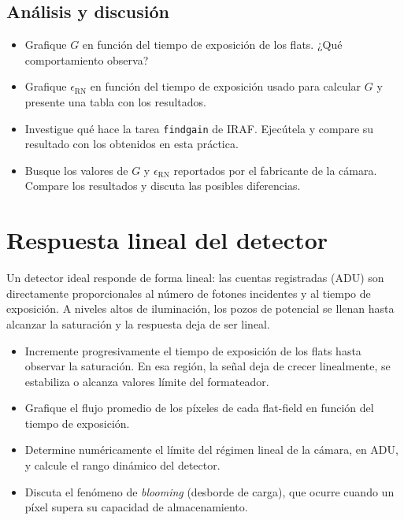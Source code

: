 \documentclass[12pt,a4paper]{article}
\begin{document}
\subsection{Análisis y discusión}

\begin{itemize}
    \item Grafique $G$ en función del tiempo de exposición de los flats.
    ¿Qué comportamiento observa?
    \item Grafique $\epsilon_{\text{RN}}$ en función del tiempo de exposición
    usado para calcular $G$ y presente una tabla con los resultados.
    \item Investigue qué hace la tarea \texttt{findgain} de IRAF. Ejecútela y
    compare su resultado con los obtenidos en esta práctica.
    \item Busque los valores de $G$ y $\epsilon_{\text{RN}}$ reportados por el
    fabricante de la cámara. Compare los resultados y discuta las posibles
    diferencias.
\end{itemize}

\section{Respuesta lineal del detector}

Un detector ideal responde de forma lineal: las cuentas registradas (ADU) son
directamente proporcionales al número de fotones incidentes y al tiempo de
exposición. A niveles altos de iluminación, los pozos de potencial se llenan
hasta alcanzar la saturación y la respuesta deja de ser lineal.




\begin{itemize}
    \item Incremente progresivamente el tiempo de exposición de los flats
    hasta observar la saturación. En esa región, la señal deja de crecer
    linealmente, se estabiliza o alcanza valores límite del formateador.
    \item Grafique el flujo promedio de los píxeles de cada flat-field en
    función del tiempo de exposición.
    \item Determine numéricamente el límite del régimen lineal de la cámara,
    en ADU, y calcule el rango dinámico del detector.
    \item Discuta el fenómeno de \textit{blooming} (desborde de carga), que
    ocurre cuando un píxel supera su capacidad de almacenamiento.
\end{itemize}
\end{document}
